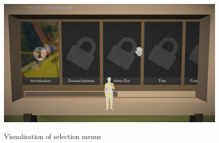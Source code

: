 \begin{figure}[htb]
\begin{minipage}[t]{0.32\linewidth}
		\centering
		\includegraphics[width=1\linewidth]{Pictures/5_Workflow/7_1_ExerciseMenu}
		\label{fig:rodeoline}
	\end{minipage}
	\caption{Visualisation of selection menus}%
	\label{fig:slacklineVariation}
\end{figure}

